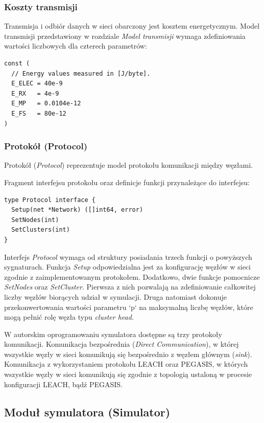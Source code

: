 \documentclass[a4paper,12pt,twoside,openany]{report}
\begin{document}
\subsubsection{Koszty transmisji}

Transmisja i odbiór danych w sieci obarczony jest kosztem energetycznym.
Model transmisji przedstawiony w rozdziale \textit{Model transmisji} wymaga zdefiniowania wartości liczbowych dla czterech parametrów:

\begin{lstlisting}
const (
  // Energy values measured in [J/byte].
  E_ELEC = 40e-9
  E_RX   = 4e-9
  E_MP   = 0.0104e-12
  E_FS   = 80e-12
)
\end{lstlisting}

\subsubsection{Protokół (Protocol)}

Protokół (\textit{Protocol}) reprezentuje model protokołu komunikacji między węzłami.

Fragment interfejsu protokołu oraz definicje funkcji przynależące do interfejsu:

\begin{lstlisting}
type Protocol interface {
  Setup(net *Network) ([]int64, error)
  SetNodes(int)
  SetClusters(int)
}
\end{lstlisting}

Interfejs \textit{Protocol} wymaga od struktury posiadania trzech funkcji o powyższych sygnaturach.
Funkcja \textit{Setup} odpowiedzialna jest za konfigurację węzłów w sieci zgodnie z zaimplementowanym protokołem. Dodatkowo, dwie funkcje pomocnicze
\textit{SetNodes} oraz \textit{SetCluster}. Pierwsza z nich pozwalają na zdefiniowanie całkowitej liczby węzłów biorących udział w symulacji.
Druga natomiast dokonuje przekonwertowania wartości parametru `p` na maksymalną liczbę węzłów, które mogą pełnić rolę węzła typu \textit{cluster head}. 

W autorskim oprogramowaniu symulatora dostępne są trzy protokoły komunikacji. Komunikacja bezpośrednia (\textit{Direct Communication}), w której wszystkie węzły w sieci komunikują się bezpośrednio z węzłem głównym (\textit{sink}).
Komunikacja z wykorzystaniem protokołu LEACH oraz PEGASIS, w których wszystkie węzły w sieci komunikują się zgodnie z topologią ustaloną w procesie konfiguracji LEACH, bądź PEGASIS.

\subsection{Moduł symulatora (Simulator)}
\end{document}
